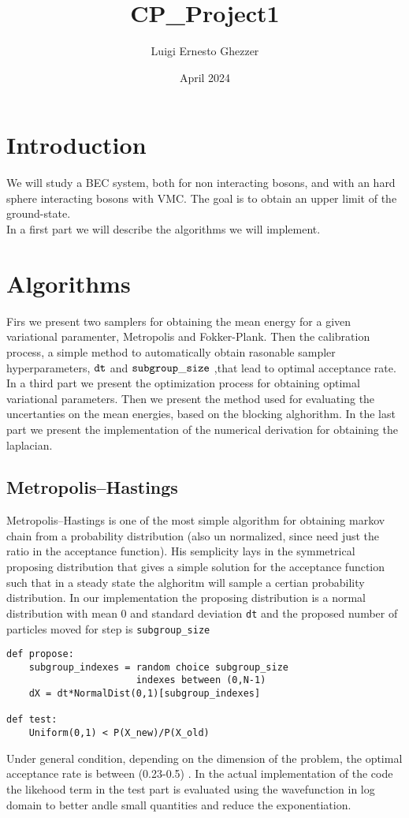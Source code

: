 \documentclass{article}
\title{CP_Project1}
\author{Luigi Ernesto Ghezzer}
\date{April 2024}
\begin{document}
\maketitle

\section{Introduction}
We will study a BEC system, both for non interacting bosons, and with an hard sphere interacting bosons with VMC. The goal is to obtain an upper limit of the ground-state.\\

In a first part we will describe the algorithms we will implement. 

\section{Algorithms}
Firs we present two samplers for obtaining the mean energy for a given variational paramenter, Metropolis and Fokker-Plank. Then the calibration process, a simple method to automatically obtain rasonable sampler hyperparameters,  ${\tt dt}$ and ${\tt subgroup\_size}$ ,that lead to optimal acceptance rate. In a third part we present the optimization process for obtaining optimal variational parameters. Then we present the method used for evaluating the uncertanties on the mean energies, based on the blocking alghorithm. In the last part we present the implementation of the numerical derivation for obtaining the laplacian. 
\subsection{Metropolis–Hastings}
Metropolis–Hastings is one of the most simple algorithm for obtaining markov chain from a probability distribution (also un normalized, since need just the ratio in the acceptance function). His semplicity lays in the symmetrical proposing distribution that gives a simple solution for the acceptance function such that in a steady state the alghoritm will sample a certian probability distribution. In our implementation the proposing distribution is a normal distribution with mean 0 and standard deviation \texttt{dt} and the proposed number of particles moved for step is \texttt{subgroup\_size}
\begin{lstlisting}
def propose:
    subgroup_indexes = random choice subgroup_size 
                       indexes between (0,N-1)
    dX = dt*NormalDist(0,1)[subgroup_indexes]

def test:
    Uniform(0,1) < P(X_new)/P(X_old)
\end{lstlisting}
Under general condition, depending on the dimension of the problem, the optimal acceptance rate is between (0.23-0.5) \cite{MetroAcc}. In the actual implementation of the code the likehood term in the test part is evaluated using the wavefunction in log domain to better andle small quantities and reduce the exponentiation.
\end{document}
